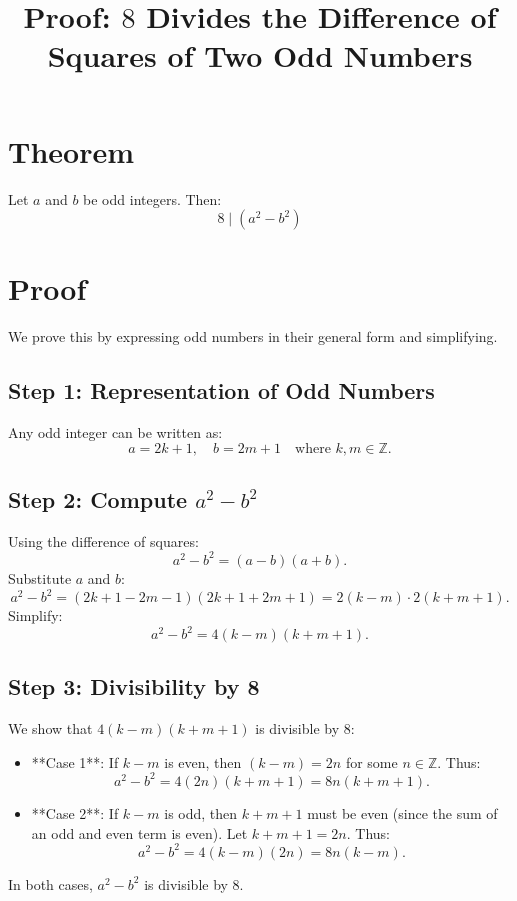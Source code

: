 \documentclass{article}
\begin{document}
\title{Proof: \( 8 \) Divides the Difference of Squares of Two Odd Numbers}
\maketitle

\section{Theorem}
Let \( a \) and \( b \) be odd integers. Then:
\[
    8 \mid (a^2 - b^2)
\]

\section{Proof}
We prove this by expressing odd numbers in their general form and simplifying.

\subsection{Step 1: Representation of Odd Numbers}
Any odd integer can be written as:
\[
    a = 2k + 1, \quad b = 2m + 1 \quad \text{where } k, m \in \mathbb{Z}.
\]

\subsection{Step 2: Compute \( a^2 - b^2 \)}
Using the difference of squares:
\[
    a^2 - b^2 = (a - b)(a + b).
\]
Substitute \( a \) and \( b \):
\[
    a^2 - b^2 = (2k + 1 - 2m - 1)(2k + 1 + 2m + 1) = 2(k - m) \cdot 2(k + m + 1).
\]
Simplify:
\[
    a^2 - b^2 = 4(k - m)(k + m + 1).
\]

\subsection{Step 3: Divisibility by 8}
We show that \( 4(k - m)(k + m + 1) \) is divisible by 8:
\begin{itemize}
    \item **Case 1**: If \( k - m \) is even, then \( (k - m) = 2n \) for some \( n \in \mathbb{Z} \). Thus:
          \[
              a^2 - b^2 = 4(2n)(k + m + 1) = 8n(k + m + 1).
          \]
    \item **Case 2**: If \( k - m \) is odd, then \( k + m + 1 \) must be even (since the sum of an odd and even term is even). Let \( k + m + 1 = 2n \). Thus:
          \[
              a^2 - b^2 = 4(k - m)(2n) = 8n(k - m).
          \]
\end{itemize}
In both cases, \( a^2 - b^2 \) is divisible by 8.
\end{document}
